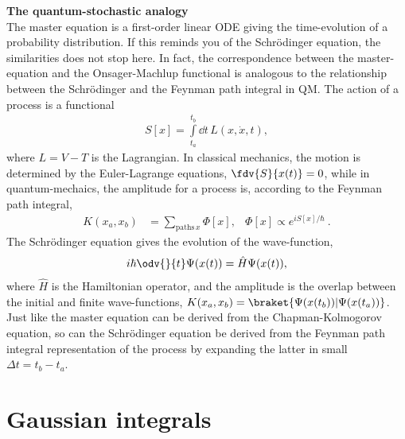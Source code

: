 \begin{framed}
    \noindent
    \textbf{The quantum-stochastic analogy}\\
    The master equation is a first-order linear ODE giving the time-evolution of a probability distribution.
    If this reminds you of the Schrödinger equation, the similarities does not stop here.
    In fact, the correspondence between the master-equation and the Onsager-Machlup functional is analogous to the relationship between the Schrödinger and the Feynman path integral in QM.
    The action of a process is a functional
    \begin{align}
        S[x] = \int\limits_{t_a}^{t_b} \dd t \, L(x, \dot x, t), 
    \end{align}
    where $L = V - T$ is the Lagrangian.
    In classical mechanics, the motion is determined by the Euler-Lagrange equations, $\fdv{ S }{ x(t) } = 0$, while in quantum-mechaics, the amplitude for a process is, according to the Feynman path integral,
    \begin{align}
        K(x_a, x_b) &= \sum_{\mathrm{paths}\, x} \Phi[x], & \Phi[x] \propto e^{iS[x] / \hbar}~.
    \end{align}
    The Schrödinger equation gives the evolution of the wave-function,
    \begin{align}
        i \hbar \odv{  }{ t } \Psi(x(t)) = \hat H \Psi(x(t)),
    \end{align}
    where $\hat H$ is the Hamiltonian operator, and the amplitude is the overlap between the initial and finite wave-functions, $K(x_a, x_b) = \braket{ \Psi(x(t_b)) | \Psi(x(t_a)) } $. Just like the master equation can be derived from the Chapman-Kolmogorov equation, so can the Schrödinger equation be derived from the Feynman path integral representation of the process by expanding the latter in small $\Delta t = t_b - t_a$.
\end{framed}




\section{Gaussian integrals}


